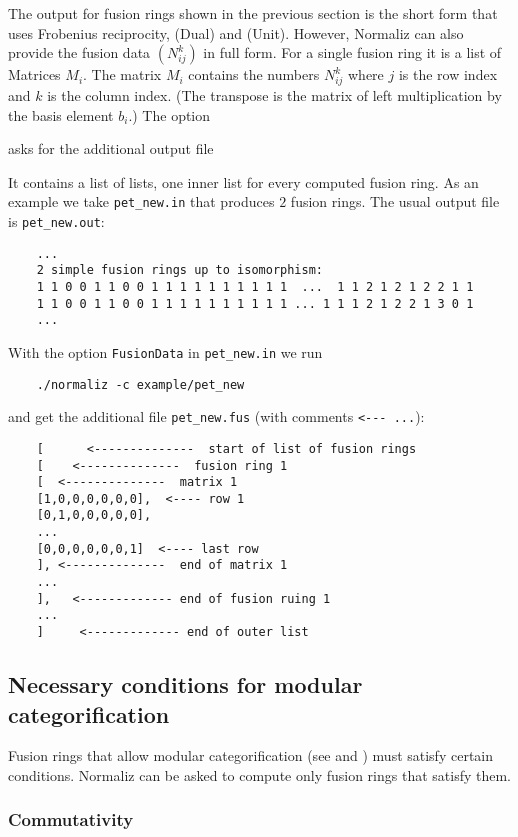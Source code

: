 The output for fusion rings shown in the previous section is the short form that uses Frobenius reciprocity, (Dual)  and (Unit). However, Normaliz can also provide the fusion data $(N_{ij}^k)$ in full form. For a  single fusion ring it is a list of Matrices $M_i$. The matrix $M_i$ contains the numbers $N_{ij}^k$ where $j$ is the row index and $k$ is the column index. (The transpose is the matrix of left multiplication by the basis element $b_i$.)
The option
\begin{itemize}
	\itemtt[FusionData]
\end{itemize}
asks for the additional output file
\begin{itemize}
\end{itemize}
It contains a list of lists, one inner list for every computed fusion ring. As an example we take \verb*|pet_new.in| that produces $2$ fusion rings. The usual output file is \verb*|pet_new.out|:
\begin{Verbatim}
	...
	2 simple fusion rings up to isomorphism:
	1 1 0 0 1 1 0 0 1 1 1 1 1 1 1 1 1 1  ...  1 1 2 1 2 1 2 2 1 1
	1 1 0 0 1 1 0 0 1 1 1 1 1 1 1 1 1 1 ... 1 1 1 2 1 2 2 1 3 0 1
	...
\end{Verbatim}
With the option \verb*|FusionData| in \verb*|pet_new.in| we run
\begin{Verbatim}
	./normaliz -c example/pet_new
\end{Verbatim}
and  get the additional file \verb*|pet_new.fus| (with comments \verb|<--- ...|):
\begin{Verbatim}
	[      <--------------  start of list of fusion rings 
	[    <--------------  fusion ring 1
	[  <--------------  matrix 1
	[1,0,0,0,0,0,0],  <---- row 1
	[0,1,0,0,0,0,0],
	...
	[0,0,0,0,0,0,1]  <---- last row
	], <--------------  end of matrix 1
	...
	],   <------------- end of fusion ruing 1     
	...
	]     <------------- end of outer list
\end{Verbatim}


\subsection{Necessary conditions for modular categorification}\label{modular}

Fusion rings that allow modular categorification (see \cite{ABPP} and \cite{EGNO}) must satisfy certain conditions. Normaliz can be asked to compute only fusion rings that satisfy them.

\subsubsection{Commutativity}

